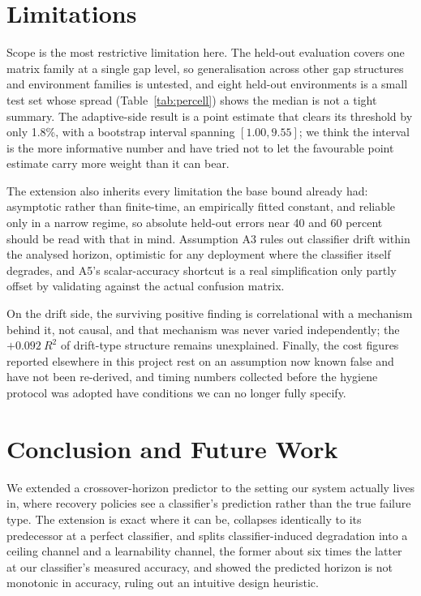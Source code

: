 \documentclass[conference]{IEEEtran}
\begin{document}
\section{Limitations}

Scope is the most restrictive limitation here. The held-out evaluation
covers one matrix family at a single gap level, so generalisation across
other gap structures and environment families is untested, and eight
held-out environments is a small test set whose spread
(Table~\ref{tab:percell}) shows the median is not a tight summary. The
adaptive-side result is a point estimate that clears its threshold by
only 1.8\%, with a bootstrap interval spanning $[1.00, 9.55]$; we think
the interval is the more informative number and have tried not to let the
favourable point estimate carry more weight than it can bear.

The extension also inherits every limitation the base bound already had:
asymptotic rather than finite-time, an empirically fitted constant, and
reliable only in a narrow regime, so absolute held-out errors near 40 and
60 percent should be read with that in mind. Assumption A3 rules out
classifier drift within the analysed horizon, optimistic for any
deployment where the classifier itself degrades, and A5's
scalar-accuracy shortcut is a real simplification only partly offset by
validating against the actual confusion matrix.

On the drift side, the surviving positive finding is correlational with
a mechanism behind it, not causal, and that mechanism was never varied
independently; the $+0.092\ R^2$ of drift-type structure remains
unexplained. Finally, the cost figures reported elsewhere in this project
rest on an assumption now known false and have not been re-derived, and
timing numbers collected before the hygiene protocol was adopted have
conditions we can no longer fully specify.

\section{Conclusion and Future Work}

We extended a crossover-horizon predictor to the setting our system
actually lives in, where recovery policies see a classifier's prediction
rather than the true failure type. The extension is exact where it can
be, collapses identically to its predecessor at a perfect classifier, and
splits classifier-induced degradation into a ceiling channel and a
learnability channel, the former about six times the latter at our
classifier's measured accuracy, and showed the predicted horizon is not
monotonic in accuracy, ruling out an intuitive design heuristic.
\end{document}
